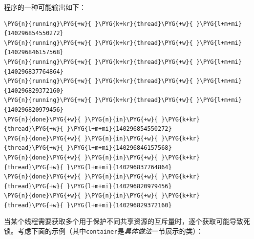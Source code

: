 
程序的一种可能输出如下：



\begin{codeblockbg}
\begin{Verbatim}[commandchars=\\\{\},breaklines=true,breakanywhere=true,fontsize=\codefont,xleftmargin=17bp]
\PYG{n}{running}\PYG{+w}{ }\PYG{k+kr}{thread}\PYG{+w}{ }\PYG{l+m+mi}{140296854550272}
\PYG{n}{running}\PYG{+w}{ }\PYG{k+kr}{thread}\PYG{+w}{ }\PYG{l+m+mi}{140296846157568}
\PYG{n}{running}\PYG{+w}{ }\PYG{k+kr}{thread}\PYG{+w}{ }\PYG{l+m+mi}{140296837764864}
\PYG{n}{running}\PYG{+w}{ }\PYG{k+kr}{thread}\PYG{+w}{ }\PYG{l+m+mi}{140296829372160}
\PYG{n}{running}\PYG{+w}{ }\PYG{k+kr}{thread}\PYG{+w}{ }\PYG{l+m+mi}{140296820979456}
\PYG{n}{done}\PYG{+w}{ }\PYG{n}{in}\PYG{+w}{ }\PYG{k+kr}{thread}\PYG{+w}{ }\PYG{l+m+mi}{140296854550272}
\PYG{n}{done}\PYG{+w}{ }\PYG{n}{in}\PYG{+w}{ }\PYG{k+kr}{thread}\PYG{+w}{ }\PYG{l+m+mi}{140296846157568}
\PYG{n}{done}\PYG{+w}{ }\PYG{n}{in}\PYG{+w}{ }\PYG{k+kr}{thread}\PYG{+w}{ }\PYG{l+m+mi}{140296837764864}
\PYG{n}{done}\PYG{+w}{ }\PYG{n}{in}\PYG{+w}{ }\PYG{k+kr}{thread}\PYG{+w}{ }\PYG{l+m+mi}{140296820979456}
\PYG{n}{done}\PYG{+w}{ }\PYG{n}{in}\PYG{+w}{ }\PYG{k+kr}{thread}\PYG{+w}{ }\PYG{l+m+mi}{140296829372160}
\end{Verbatim}
\end{codeblockbg}



当某个线程需要获取多个用于保护不同共享资源的互斥量时，逐个获取可能导致死锁。考虑下面的示例（其中\texttt{container}是\textit{具体做法}一节展示的类）：



